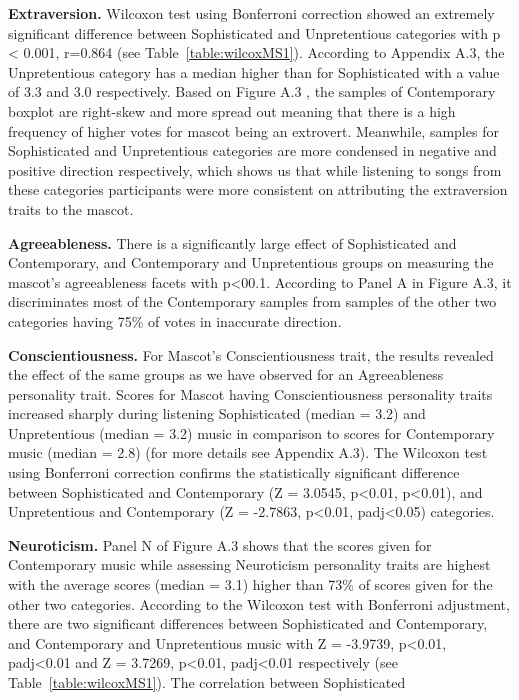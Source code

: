 \par \textbf{Extraversion.} Wilcoxon test using Bonferroni correction showed an extremely significant difference
between Sophisticated and Unpretentious categories with p < 0.001, r=0.864 (see Table~\ref{table:wilcoxMS1}).
According to Appendix A.3, the Unpretentious category has a median higher than for Sophisticated with a value of 3.3
and 3.0 respectively.
Based on Figure A.3 , the samples of Contemporary boxplot are right-skew and more spread out meaning that there is a
high frequency of higher votes for mascot being an extrovert. Meanwhile, samples for Sophisticated and Unpretentious
categories are more condensed in negative and positive direction respectively, which shows us that while listening to
songs from these categories participants were more consistent on attributing the extraversion traits to the mascot.
\par \textbf{Agreeableness.} There is a significantly large effect of Sophisticated and Contemporary, and Contemporary
and Unpretentious groups on measuring the mascot’s agreeableness facets with p<00.1. According to Panel A in Figure A.3,
it discriminates most of the Contemporary samples from samples of the other two categories having 75\% of votes in inaccurate direction.
\par \textbf{Conscientiousness.} For Mascot’s Conscientiousness trait, the results revealed the effect of the same
groups as we have observed for an Agreeableness personality trait. Scores for Mascot having Conscientiousness personality
traits increased sharply during listening Sophisticated (median = 3.2) and Unpretentious (median = 3.2) music in
comparison to scores for Contemporary music (median = 2.8) (for more details see Appendix A.3). The Wilcoxon test using
Bonferroni correction confirms the statistically significant difference between Sophisticated and Contemporary
(Z = 3.0545, p<0.01, p<0.01), and Unpretentious and Contemporary (Z = -2.7863, p<0.01, padj<0.05) categories.
\par \textbf{Neuroticism.} Panel N of Figure A.3 shows that the scores given for Contemporary music while assessing
Neuroticism personality traits are highest with the average scores (median = 3.1) higher than 73\% of scores given for
the other two categories. According to the Wilcoxon test with Bonferroni adjustment, there are two significant differences
between Sophisticated and Contemporary, and Contemporary and Unpretentious music with  Z = -3.9739, p<0.01, padj<0.01
and Z = 3.7269, p<0.01, padj<0.01 respectively (see Table~\ref{table:wilcoxMS1}). The correlation between Sophisticated
